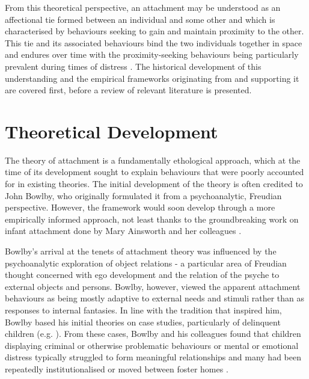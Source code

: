 \documentclass[12pt]{report}
\begin{document}
From this theoretical perspective, an attachment may be understood as an affectional tie formed between an individual and some other and which is characterised by behaviours seeking to gain and maintain proximity to the other. This tie and its associated behaviours bind the two individuals together in space and endures over time with the proximity-seeking behaviours being particularly prevalent during times of distress \cite{Ainsworth1970,Bowlby1988}.
The historical development of this understanding and the empirical frameworks originating from and supporting it are covered first, before a review of relevant literature is presented.

\section{Theoretical Development}
The theory of attachment is a fundamentally ethological approach, which at the time of its development sought to explain behaviours that were poorly accounted for in existing theories. The initial development of the theory is often credited to John Bowlby, who originally formulated it from a psychoanalytic, Freudian perspective. However, the framework would soon develop through a more empirically informed approach, not least thanks to the groundbreaking work on infant attachment done by Mary Ainsworth and her colleagues \cite{Ainsworth1970}.

Bowlby's arrival at the tenets of attachment theory was influenced by the psychoanalytic exploration of object relations - a particular area of Freudian thought concerned with ego development and the relation of the psyche to external objects and persons.
Bowlby, however, viewed the apparent attachment behaviours as being mostly adaptive to external needs and stimuli rather than as responses to internal fantasies. In line with the tradition that inspired him, Bowlby based his initial theories on case studies, particularly of delinquent children (e.g. \cite{bowlby1946thieves}). From these cases, Bowlby and his colleagues found that children displaying criminal or otherwise problematic behaviours or mental or emotional distress typically struggled to form meaningful relationships and many had been repeatedly institutionalised or moved between foster homes \cite{bowlby1951WHO}.
\end{document}

